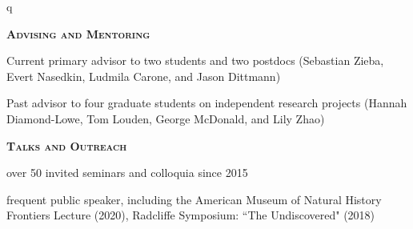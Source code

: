 q\documentclass[12pt,letterpaper]{article}
\begin{document}
\textbf{\textsc{Advising and Mentoring}} 
\begin{compactitem}
\item Current primary advisor to two students and two postdocs (Sebastian Zieba, Evert Nasedkin, Ludmila Carone, and Jason Dittmann)
\item Past advisor to four graduate students on independent research projects (Hannah Diamond-Lowe, Tom Louden, George McDonald, and Lily Zhao)
\end{compactitem}

\vspace{7mm}

\textbf{\textsc{Talks and Outreach}} 
\begin{compactitem}
\item over 50 invited seminars and colloquia since 2015 
\item frequent public speaker, including the
    American Museum of Natural History Frontiers Lecture (2020), Radcliffe Symposium: ``The Undiscovered" (2018)
\end{compactitem}
\end{document}

